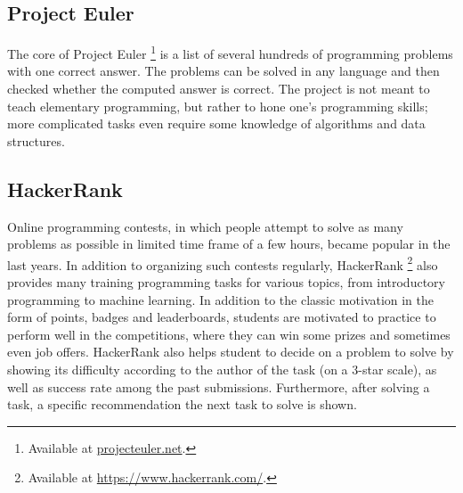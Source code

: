 

\subsection{Project Euler}
\label{sec:project-euler}
The core of Project Euler%
\footnote{Available at \url{projecteuler.net}.}
is a list of several hundreds of programming problems with one correct answer.
The problems can be solved in any language
and then checked whether the computed answer is correct.
The project is not meant to teach elementary programming,
but rather to hone one’s programming skills;
more complicated tasks even require some knowledge of algorithms and data structures.



\subsection{HackerRank}
\label{sec:hacker-rank}

Online programming contests,
in which people attempt to solve as many problems as possible
in limited time frame of a few hours,
became popular in the last years.
In addition to organizing such contests regularly,
HackerRank%
\footnote{Available at \url{https://www.hackerrank.com/}.}
also provides many training programming tasks for various topics,
from introductory programming to machine learning.
In addition to the classic motivation in the form of points, badges and leaderboards, students are motivated to practice to perform well in the competitions,
where they can win some prizes and sometimes even job offers.
HackerRank also helps student to decide on a problem to solve by showing its difficulty according to the author of the task (on a 3-star scale),
as well as success rate among the past submissions.
Furthermore, after solving a task,
a specific recommendation the next task to solve is shown.


